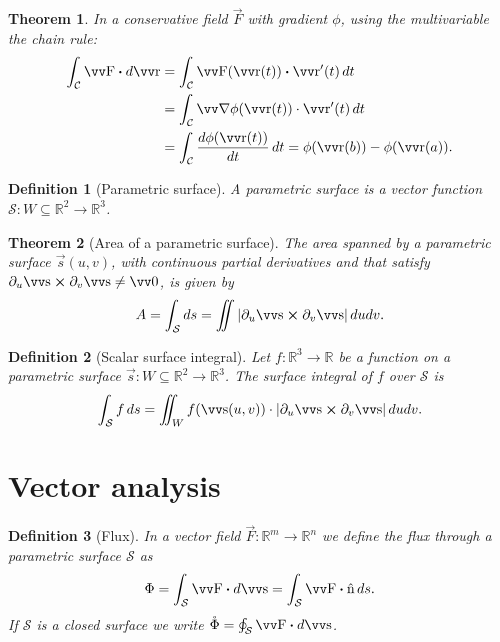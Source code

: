\documentclass[twocolumn, margin=small]{tex/hsrzf}
\theoremstyle{fuvarzf}
\newtheorem{theorem}{Theorem}
\newtheorem{definition}{Definition}
\begin{document}
\begin{theorem}
  In a conservative field \(\vec{F}\) with gradient \(\phi\), using the
  multivariable the chain rule:
  \begin{align*}
    \int_\mathcal{C} \vec{F} \dotp d\vec{r} 
    &= \int_\mathcal{C} \vec{F}(\vec{r}(t)) \dotp \vec{r}'(t) \,dt \\
    &= \int_\mathcal{C} \grad \phi(\vec{r}(t)) \cdot \vec{r}'(t) \,dt \\
    &= \int_\mathcal{C} \frac{d\phi(\vec{r}(t))}{dt}\,dt
    = \phi(\vec{r}(b)) - \phi(\vec{r}(a)) .
  \end{align*}
\end{theorem}

\begin{definition}[Parametric surface]
  A parametric surface is a vector function \(\mathcal{S}: W \subseteq \mathbb{R}^2 \to
  \mathbb{R}^3\).
\end{definition}

\begin{theorem}[Area of a parametric surface]
  The area spanned by a parametric surface \(\vec{s}(u,v)\), with continuous
  partial derivatives and that satisfy \(\partial_u \vec{s} \crossp \partial_v
  \vec{s} \neq \vec{0}\), is given by
  \[
    A = \int_\mathcal{S} ds 
      = \iint |\partial_u \vec{s} \crossp \partial_v \vec{s}| \,dudv .
  \]
\end{theorem}

\begin{definition}[Scalar surface integral]
  Let \(f: \mathbb{R}^3 \to \mathbb{R}\) be a function on a parametric surface
  \(\vec{s}: W \subseteq \mathbb{R}^2 \to \mathbb{R}^3\).  The surface integral
  of \(f\) over \(\mathcal{S}\) is
  \[
    \int_\mathcal{S} f \,ds = 
      \iint_W f(\vec{s}(u,v)) \cdot 
        |\partial_u \vec{s} \crossp \partial_v \vec{s}| \,dudv .
  \]
\end{definition}

\section{Vector analysis}

\begin{definition}[Flux]
  In a vector field \(\vec{F}: \mathbb{R}^m \to \mathbb{R}^n\) we define the
  \emph{flux} through a parametric surface \(\mathcal{S}\) as
  \[
    \Phi = \int_\mathcal{S} \vec{F} \dotp d\vec{s} 
      = \int_\mathcal{S} \vec{F} \dotp \uvec{n} \,ds .
  \]
  If \(\mathcal{S}\) is a closed surface we write
  \(
    \mathring{\Phi} = \oint_\mathcal{S} \vec{F} \dotp d\vec{s}
  \).
\end{definition}
\end{document}
